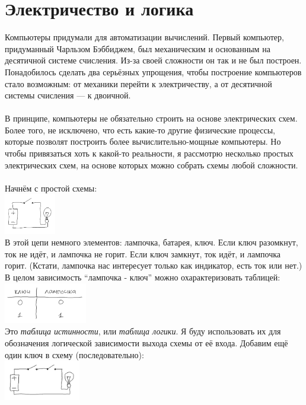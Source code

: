 \documentclass[11pt]{book}
\begin{document}
\section{Электричество и логика}
Компьютеры придумали для автоматизации вычислений.
Первый компьютер, придуманный Чарльзом Бэббиджем, был механическим и основанным на десятичной системе счисления.
Из-за своей сложности он так и не был построен.
Понадобилось сделать два серьёзных упрощения, чтобы построение компьютеров стало возможным:
от механики перейти к электричеству, а от десятичной системы счисления --- к двоичной.
\\ \\
В принципе, компьютеры не обязательно строить на основе электрических схем.
Более того, не исключено, что есть какие-то другие физические процессы,
которые позволят построить более вычислительно-мощные компьютеры.
Но чтобы привязаться хоть к какой-то реальности, я рассмотрю несколько простых электрических схем,
на основе которых можно собрать схемы любой сложности.
\\ \\
Начнём с простой схемы:
\\
\includegraphics[height=0.7in]{pic/2.png}
\\
В этой цепи немного элементов: лампочка, батарея, ключ. Если ключ разомкнут,
ток не идёт, и лампочка не горит. Если ключ замкнут, ток идёт, и лампочка горит.
(Кстати, лампочка нас интересует только как индикатор, есть ток или нет.)
В целом зависимость ``лампочка - ключ'' можно охарактеризовать таблицей:
\\
\includegraphics[height=0.7in]{pic/3.png}
\\
Это \emph{таблица истинности}, или \emph{таблица логики}.
Я буду использовать их для обозначения логической зависимости выхода схемы от её входа.
Добавим ещё один ключ в схему (последовательно):
\\
\includegraphics[height=0.7in]{pic/4.png}
\end{document}

